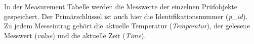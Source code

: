 In der Measurement Tabelle werden die Messwerte der einzelnen Prüfobjekte gespeichert. Der Primärschlüssel ist auch hier die Identifikationsnummer (\textit{p\_id}). Zu jedem Messeintrag gehört die aktuelle Temperatur (\textit{Temperatur}), der gelesene Messwert (\textit{value}) und die aktuelle Zeit (\textit{Time}).


